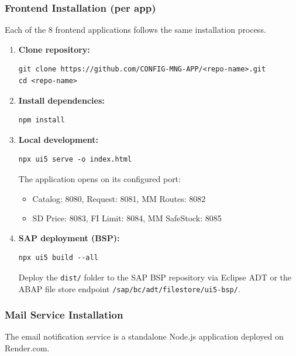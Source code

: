 \documentclass[12pt,a4paper]{report}
\begin{document}
\subsubsection{Frontend Installation (per app)}

Each of the 8 frontend applications follows the same installation process.

\begin{enumerate}[leftmargin=2em]
  \item \textbf{Clone repository:}
\begin{lstlisting}
git clone https://github.com/CONFIG-MNG-APP/<repo-name>.git
cd <repo-name>
\end{lstlisting}

  \item \textbf{Install dependencies:}
\begin{lstlisting}
npm install
\end{lstlisting}

  \item \textbf{Local development:}
\begin{lstlisting}
npx ui5 serve -o index.html
\end{lstlisting}
    The application opens on its configured port:
    \begin{itemize}
      \item Catalog: 8080, Request: 8081, MM Routes: 8082
      \item SD Price: 8083, FI Limit: 8084, MM SafeStock: 8085
    \end{itemize}

  \item \textbf{SAP deployment (BSP):}
\begin{lstlisting}
npx ui5 build --all
\end{lstlisting}
    Deploy the \texttt{dist/} folder to the SAP BSP repository via Eclipse ADT or the ABAP file store endpoint \texttt{/sap/bc/adt/filestore/ui5-bsp/}.
\end{enumerate}

\subsubsection{Mail Service Installation}

The email notification service is a standalone Node.js application deployed on Render.com.
\end{document}
